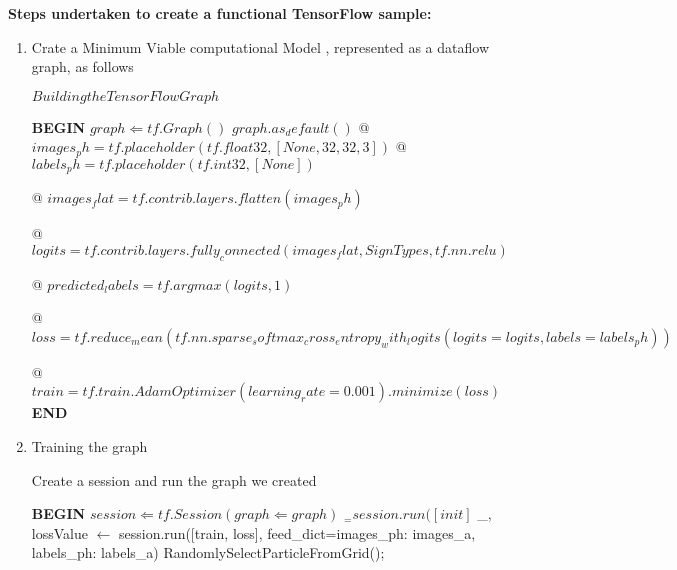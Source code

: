 \documentclass[runningheads,a4paper,11pt]{report}
\begin{document}
\textbf{Steps undertaken to create a functional TensorFlow sample: }

\begin{enumerate}
  \item Crate a Minimum Viable computational Model , represented as a dataflow graph, as follows
  
  \begin{algorithm} 
\caption{$Building the TensorFlow Graph$} 
\begin{algorithmic}
\STATE \textbf{BEGIN}
    \REQUIRE $graph \Leftarrow tf.Graph()$
    \ENSURE $graph.as_default()$
    \STATE @ $images_ph = tf.placeholder(tf.float32, [None, 32, 32, 3])$
    \STATE @ $labels_ph = tf.placeholder(tf.int32, [None])$

    
    \STATE @ $images_flat = tf.contrib.layers.flatten(images_ph)$

    
    \STATE @ $logits = tf.contrib.layers.fully_connected(images_flat, SignTypes, tf.nn.relu)$
    
    \STATE @ $predicted_labels = tf.argmax(logits, 1)$

    
    \STATE @ $loss = tf.reduce_mean(tf.nn.sparse_softmax_cross_entropy_with_logits(logits=logits, labels=labels_ph))$

    
    \STATE @ $train = tf.train.AdamOptimizer(learning_rate=0.001).minimize(loss)$
\STATE \textbf{END}
\end{algorithmic}
\end{algorithm}
  
  \item Training the graph
  \begin{algorithm} 
\caption{Create a session and run the graph we created} 
\begin{algorithmic}
\STATE \textbf{BEGIN}
    \REQUIRE $session \Leftarrow tf.Session(graph \Leftarrow graph)$
    \ENSURE $_ = session.run([init]$
  				\STATE _, lossValue $\leftarrow$  session.run([train, loss], 
                                feed_dict={images_ph: images_a, labels_ph: labels_a}) RandomlySelectParticleFromGrid();
  	

\end{algorithmic}
\end{algorithm}
\end{enumerate}
\end{document}
